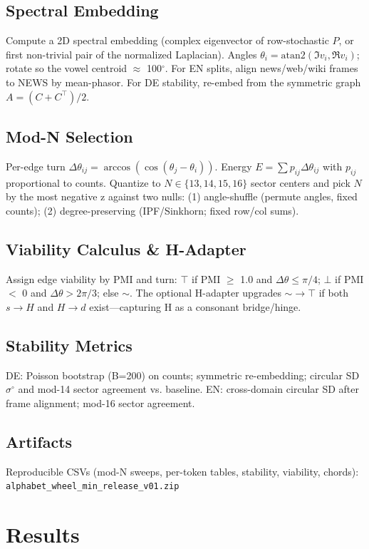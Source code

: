 \documentclass[10pt]{article}
\begin{document}
\subsection{Spectral Embedding}
Compute a 2D spectral embedding (complex eigenvector of row-stochastic $P$, or first non-trivial pair of the normalized Laplacian). Angles $\theta_i = \mathrm{atan2}(\Im v_i,\Re v_i)$; rotate so the vowel centroid $\approx$ 100$^\circ$. For EN splits, align news/web/wiki frames to NEWS by mean-phasor. For DE stability, re-embed from the symmetric graph $A=(C + C^\top)/2$.

\subsection{Mod-N Selection}
Per-edge turn $\Delta\theta_{ij} = \arccos(\cos(\theta_j - \theta_i))$. Energy $E=\sum p_{ij}\Delta\theta_{ij}$ with $p_{ij}$ proportional to counts. Quantize to $N\in\{13,14,15,16\}$ sector centers and pick $N$ by the most negative z against two nulls: (1) angle-shuffle (permute angles, fixed counts); (2) degree-preserving (IPF/Sinkhorn; fixed row/col sums).

\subsection{Viability Calculus \& H-Adapter}
Assign edge viability by PMI and turn: $\top$ if PMI $\geq$ 1.0 and $\Delta\theta \le \pi/4$; $\bot$ if PMI $<$ 0 and $\Delta\theta > 2\pi/3$; else $\sim$. The optional H-adapter upgrades $\sim \to \top$ if both $s\to H$ and $H\to d$ exist—capturing H as a consonant bridge/hinge.

\subsection{Stability Metrics}
DE: Poisson bootstrap (B=200) on counts; symmetric re-embedding; circular SD $\sigma^\circ$ and mod-14 sector agreement vs. baseline.  
EN: cross-domain circular SD after frame alignment; mod-16 sector agreement.

\subsection{Artifacts}
Reproducible CSVs (mod-N sweeps, per-token tables, stability, viability, chords):\\
\texttt{alphabet\_wheel\_min\_release\_v01.zip} 

\section{Results}
\end{document}
